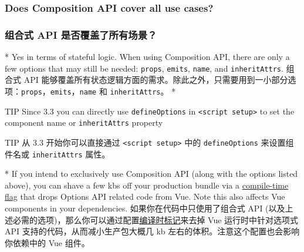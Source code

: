 \begin{paracol}{2}
\subsubsection{Does Composition API cover all use cases?}
\switchcolumn
\subsubsection{组合式 API 是否覆盖了所有场景？}
\switchcolumn[0]*%
Yes in terms of stateful logic. When using Composition API, there are
only a few options that may still be needed: \texttt{props},
\texttt{emits}, \texttt{name}, and \texttt{inheritAttrs}.
\switchcolumn
组合式 API
能够覆盖所有状态逻辑方面的需求。除此之外，只需要用到一小部分选项：\texttt{props}，\texttt{emits}，\texttt{name}
和 \texttt{inheritAttrs}。
\switchcolumn[0]*%
\begin{vueQuote}{TIP}
Since 3.3 you can directly use \texttt{defineOptions} in
\texttt{\textless{}script\ setup\textgreater{}} to set the component
name or \texttt{inheritAttrs} property
\end{vueQuote} 
\switchcolumn
\begin{vueQuote}{TIP}
从 3.3 开始你可以直接通过
\texttt{\textless{}script\ setup\textgreater{}} 中的
\texttt{defineOptions} 来设置组件名或 \texttt{inheritAttrs} 属性。
\end{vueQuote} 
\switchcolumn[0]*%
If you intend to exclusively use Composition API (along with the options
listed above), you can shave a few kbs off your production bundle via a
\href{https://github.com/vuejs/core/tree/main/packages/vue\#bundler-build-feature-flags}{compile-time
flag} that drops Options API related code from Vue. Note this also
affects Vue components in your dependencies.
\switchcolumn
如果你在代码中只使用了组合式 API
(以及上述必需的选项)，那么你可以通过配置\href{https://github.com/vuejs/core/tree/main/packages/vue\#bundler-build-feature-flags}{编译时标记}来去掉
Vue 运行时中针对选项式 API 支持的代码，从而减小生产包大概几 kb
左右的体积。注意这个配置也会影响你依赖中的 Vue 组件。
\end{paracol}



